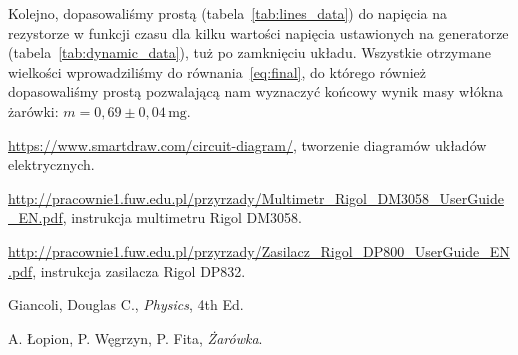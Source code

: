 \documentclass[12pt]{article}
\begin{document}
Kolejno, dopasowaliśmy prostą (tabela~\ref{tab:lines_data}) do napięcia na rezystorze w funkcji czasu dla kilku wartości napięcia ustawionych na generatorze (tabela~\ref{tab:dynamic_data}), tuż po zamknięciu układu. Wszystkie otrzymane wielkości wprowadziliśmy do równania~\eqref{eq:final}, do którego również dopasowaliśmy prostą pozwalającą nam wyznaczyć końcowy wynik masy włókna żarówki: $m=0{,}69\pm0{,}04\,\mathrm{mg}$.


\newpage
\begin{thebibliography}{5}

\url{https://www.smartdraw.com/circuit-diagram/}, tworzenie diagramów układów elektrycznych.

\url{http://pracownie1.fuw.edu.pl/przyrzady/Multimetr_Rigol_DM3058_UserGuide_EN.pdf}, instrukcja multimetru Rigol DM3058.

\url{http://pracownie1.fuw.edu.pl/przyrzady/Zasilacz_Rigol_DP800_UserGuide_EN.pdf}, instrukcja zasilacza Rigol DP832.

Giancoli, Douglas C., \emph{Physics}, 4th Ed.

A. Łopion, P. Węgrzyn, P. Fita, \emph{Żarówka}.

\end{thebibliography}
\end{document}
